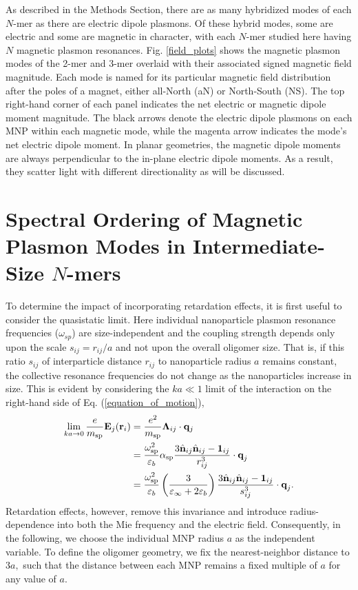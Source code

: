 \documentclass [11pt, proquest] {uwthesis}[2016/11/22]
\begin{document}
As described in the Methods Section, there are as many hybridized modes of each $N$-mer as there are electric dipole plasmons. Of these hybrid modes, some are electric and some are magnetic in character, with each $N$-mer studied here having $N$ magnetic plasmon resonances. Fig. \ref{field_plots} shows the magnetic plasmon modes of the 2-mer and 3-mer overlaid with their associated signed magnetic field magnitude. Each mode is named for its particular magnetic field distribution after the poles of a magnet, either all-North (aN) or North-South (NS). The top right-hand corner of each panel indicates the net electric or magnetic dipole moment magnitude. The black arrows denote the electric dipole plasmons on each MNP within each magnetic mode, while the magenta arrow indicates the mode's net electric dipole moment. In planar geometries, the magnetic dipole moments are always perpendicular to the in-plane electric dipole moments. As a result, they scatter light with different directionality as will be discussed.




\section*{Spectral Ordering of Magnetic Plasmon Modes in Intermediate-Size $N$-mers}
To determine the impact of incorporating retardation effects, it is first useful to consider the quasistatic limit. Here individual nanoparticle plasmon resonance frequencies ($\omega_{sp}$) are size-independent and the coupling strength depends only upon the scale $s_{ij} = r_{ij}/a$ and not upon the overall oligomer size. That is, if this ratio $s_{ij}$ of interparticle distance $r_{ij}$ to nanoparticle radius $a$ remains constant, the collective resonance frequencies do not change as the nanoparticles increase in size. This is evident by considering the $ka\ll 1$ limit of the interaction on the right-hand side of Eq. (\ref{equation_of_motion}),
\begin{equation}
\begin{aligned}
\lim_{ka \to 0}\frac{e}{m_{\textrm{sp}}}\textbf{E}_j(\textbf{r}_i) &= \frac{e^2}{m_{\textrm{sp}}}\boldsymbol{\Lambda}_{ij}\cdot{\bf q}_j\\ 
&= \frac{\omega_{\textrm{sp}}^2}{\varepsilon_b}\alpha_{\textrm{sp}}\frac{3\hat{\textbf{n}}_{ij}\hat{\textbf{n}}_{ij} - \textbf{1}_{ij}}{r_{ij}^3} \cdot \textbf{q}_j \\
&= \frac{\omega_{\textrm{sp}}^2}{\varepsilon_b} \left(\frac{3}{\varepsilon_{\infty}+2\varepsilon_b}\right)\frac{3\hat{\textbf{n}}_{ij}\hat{\textbf{n}}_{ij} - \textbf{1}_{ij}}{s_{ij}^3} \cdot \textbf{q}_j.
\end{aligned}
\label{quasistatic_coupling}
\end{equation}
Retardation effects, however, remove this invariance and introduce radius-dependence into both the Mie frequency and the electric field. Consequently, in the following, we choose the individual MNP radius $a$ as the independent variable. To define the oligomer geometry, we fix the nearest-neighbor distance to $3a,$ such that the distance between each MNP remains a fixed multiple of $a$ for any value of $a.$
\end{document}
